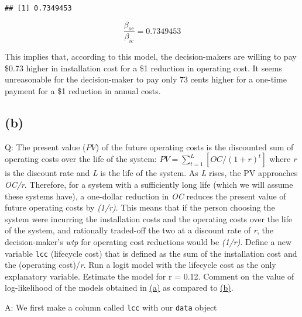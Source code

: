 \documentclass[
]{article}
\newenvironment{Shaded}{\begin{snugshade}}{\end{snugshade}}
\newcommand{\DecValTok}[1]{\textcolor[rgb]{0.00,0.00,0.81}{#1}}
\newcommand{\FloatTok}[1]{\textcolor[rgb]{0.00,0.00,0.81}{#1}}
\newcommand{\NormalTok}[1]{#1}
\newcommand{\OperatorTok}[1]{\textcolor[rgb]{0.81,0.36,0.00}{\textbf{#1}}}
\newcommand{\StringTok}[1]{\textcolor[rgb]{0.31,0.60,0.02}{#1}}
\begin{document}
\begin{verbatim}
## [1] 0.7349453
\end{verbatim}

\begin{equation*}
\frac{\beta_{oc}}{\beta_{ic}}=0.7349453
\end{equation*}

This implies that, according to this model, the decision-makers are
willing to pay \$0.73 higher in installation cost for a \$1 reduction in
operating cost. It seems unreasonable for the decision-maker to pay only
73 cents higher for a one-time payment for a \$1 reduction in annual
costs.

\hypertarget{oneb}{%
\subsection{(b)}\label{oneb}}

Q: The present value (\(PV\)) of the future operating costs is the
discounted sum of operating costs over the life of the system:
\(PV=\sum_{t=1}^{L}[OC/(1+r)^{t}]\) where \emph{r} is the discount rate
and \emph{L} is the life of the system. As \emph{L} rises, the PV
approaches \emph{OC/r}. Therefore, for a system with a sufficiently long
life (which we will assume these systems have), a one-dollar reduction
in \emph{OC} reduces the present value of future operating costs by
\emph{(1/r)}. This means that if the person choosing the system were
incurring the installation costs and the operating costs over the life
of the system, and rationally traded-off the two at a discount rate of
\emph{r}, the decision-maker's \emph{wtp} for operating cost reductions
would be \emph{(1/r)}. Define a new variable \texttt{lcc} (lifecycle
cost) that is defined as the sum of the installation cost and the
(operating cost)/\emph{r}. Run a logit model with the lifecycle cost as
the only explanatory variable. Estimate the model for r = 0.12. Comment
on the value of log-likelihood of the models obtained in
\protect\hyperlink{onea}{(a)} as compared to
\protect\hyperlink{oneb}{(b)}.

A: We first make a column called \texttt{lcc} with our \texttt{data}
object

\begin{Shaded}
\end{Shaded}
\end{document}
